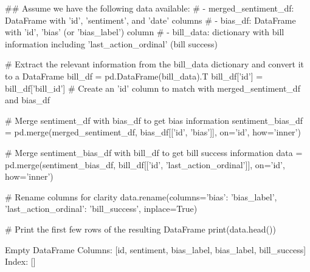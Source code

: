 \begin{pyin}
\## Assume we have the following data available:
# - merged_sentiment_df: DataFrame with 'id', 'sentiment', and 'date' columns
# - bias_df: DataFrame with 'id', 'bias' (or 'bias_label') column
# - bill_data: dictionary with bill information including 'last_action_ordinal' (bill success)

# Extract the relevant information from the bill_data dictionary and convert it to a DataFrame
bill_df = pd.DataFrame(bill_data).T
bill_df['id'] = bill_df['bill_id']  # Create an 'id' column to match with merged_sentiment_df and bias_df

# Merge sentiment_df with bias_df to get bias information
sentiment_bias_df = pd.merge(merged_sentiment_df, bias_df[['id', 'bias']], on='id', how='inner')

# Merge sentiment_bias_df with bill_df to get bill success information
data = pd.merge(sentiment_bias_df, bill_df[['id', 'last_action_ordinal']], on='id', how='inner')

# Rename columns for clarity
data.rename(columns={'bias': 'bias_label', 'last_action_ordinal': 'bill_success'}, inplace=True)

# Print the first few rows of the resulting DataFrame
print(data.head())
\end{pyin}

\begin{pyprint}
Empty DataFrame
Columns: [id, sentiment, bias_label, bias_label, bill_success]
Index: []
\end{pyprint}

